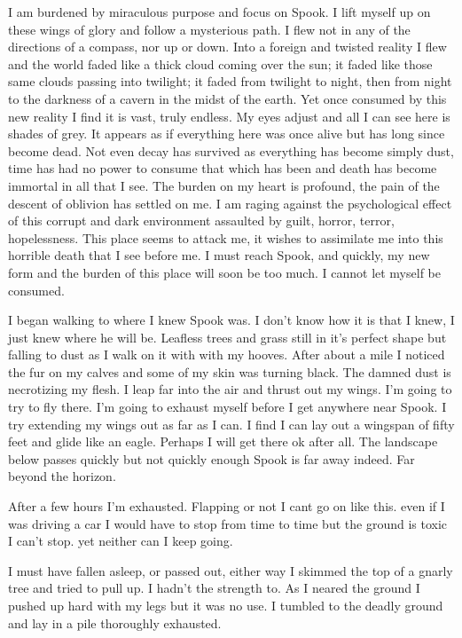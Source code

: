 I am burdened by miraculous purpose and focus on Spook. I lift myself up on these wings of glory and follow a mysterious path. I flew not in any of the directions of a compass, nor up or down. Into a foreign and twisted reality I flew and the world faded like a thick cloud coming over the sun; it faded like those same clouds passing into twilight; it faded from twilight to night, then from night to the darkness of a cavern in the midst of the earth. Yet once consumed by this new reality I find it is vast, truly endless. My eyes adjust and all I can see here is shades of grey. It appears as if everything here was once alive but has long since become dead. Not even decay has survived as everything has become simply dust, time has had no power to consume that which has been and death has become immortal in all that I see. The burden on my heart is profound, the pain of the descent of oblivion has settled on me. I am raging against the psychological effect of this corrupt and dark environment assaulted by guilt, horror, terror, hopelessness. This place seems to attack me, it wishes to assimilate me into this horrible death that I see before me. I must reach Spook, and quickly, my new form and the burden of this place will soon be too much. I cannot let myself be consumed.

I began walking to where I knew Spook was. I don't know how it is that I knew, I just knew where he will be. Leafless trees and grass still in it's perfect shape but falling to dust as I walk on it with with my hooves. After about a mile I noticed the fur on my calves and some of my skin was turning black. The damned dust is necrotizing my flesh. I leap far into the air and thrust out my wings. I'm going to try to fly there. I'm going to exhaust myself before I get anywhere near Spook. I try extending my wings out as far as I can. I find I can lay out a wingspan of fifty feet and glide like an eagle. Perhaps I will get there ok after all. The landscape below passes quickly but not quickly enough Spook is far away indeed. Far beyond the horizon.

After a few hours I'm exhausted. Flapping or not I cant go on like this. even if I was driving a car I would have to stop from time to time but the ground is toxic I can't stop. yet neither can I keep going.

I must have fallen asleep, or passed out, either way I skimmed the top of a gnarly tree and tried to pull up. I hadn't the strength to. As I neared the ground I pushed up hard with my legs but it was no use. I tumbled to the deadly ground and lay in a pile thoroughly exhausted.

